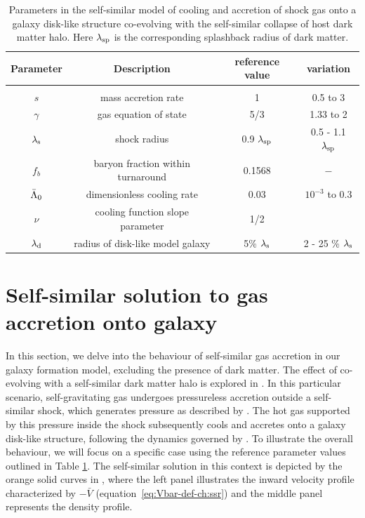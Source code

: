 \begin{table}[htbp]
\centering
\begin{tabular}{c|c|c|c}%
\hline
Parameter & Description & reference value & variation \\
\hline &&&\\
$s$ & mass accretion rate & 1 & 0.5 to 3 \\
$\gamma$ & gas equation of state & 5/3 & 1.33 to 2  \\
$\lambda_{\rm s}$ & shock radius & 0.9 $\lambda_{\rm sp}$ & 0.5 - 1.1 $\lambda_{\rm sp}$ \\
$f_b$ & baryon fraction within turnaround & 0.1568 & $-$\\
$\Bar{\Lambda}_0$ & dimensionless cooling rate & $0.03$ & $10^{-3}$ to $0.3$ \\
$\nu$ & cooling function slope parameter & 1/2 & \\
$\lambda_{\rm d}$ & radius of disk-like model galaxy & 5\% $\lambda_{\rm s}$ & 2 - 25 \% $\lambda_{\rm s}$  \\
\hline 
\end{tabular}
\caption{Parameters in the self-similar model of cooling and accretion of shock gas onto a galaxy disk-like structure co-evolving with the self-similar collapse of host dark matter halo. Here $\lambda_{\rm sp}$ is the corresponding splashback radius of dark matter.}
\label{tab:parameters-descr-ch:ssr}
\end{table}





\section{ Self-similar solution to gas accretion onto galaxy}
\label{sec:results-gaso-ch:ssr}
In this section, we delve into the behaviour of self-similar gas accretion in our galaxy formation model, excluding the presence of dark matter. The effect of co-evolving with a self-similar dark matter halo is explored in . In this particular scenario, self-gravitating gas undergoes pressureless accretion outside a self-similar shock, which generates pressure as described by . The hot gas supported by this pressure inside the shock subsequently cools and accretes onto a galaxy disk-like structure, following the dynamics governed by . To illustrate the overall behaviour, we will focus on a specific case using the reference parameter values outlined in Table \ref{tab:parameters-descr-ch:ssr}. The self-similar solution in this context is depicted by the orange solid curves in , where the left panel illustrates the inward velocity profile characterized by $-\bar{V}$ (equation~\ref{eq:Vbar-def-ch:ssr}) and the middle panel represents the density profile.  



